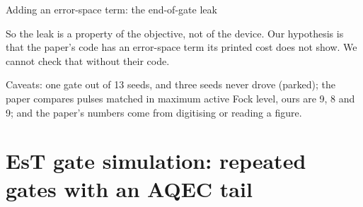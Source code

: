 \begin{frame}{Adding an error-space term: the end-of-gate leak}
{\begin{ntitem}
      \item So the leak is a property of the objective, not of the device. Our hypothesis is
            that the paper's code has an error-space term its printed cost does not show. We
            cannot check that without their code.
      \item Caveats: one gate out of 13 seeds, and three seeds never drove (parked); the paper
            compares pulses matched in maximum active Fock level, ours are 9, 8 and 9; and the
            paper's numbers come from digitising or reading a figure.
    \end{ntitem}}
\end{frame}

\section[EsT gate simulation]{EsT gate simulation: repeated gates with an AQEC tail}

